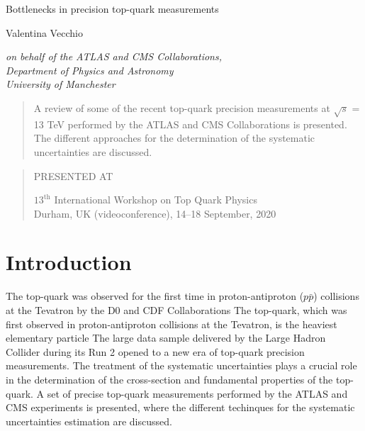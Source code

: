\documentclass[12pt]{article}
\newcommand\pubnumber{SNSN-323-63}
\newcommand\pubdate{\today}
\def\institute{on behalf of the ATLAS and CMS Collaborations,\\Department of Physics and Astronomy\\ University of Manchester}
\def\Title#1{\begin{center} {\Large #1 } \end{center}}
\def\Author#1{\begin{center}{ \sc #1} \end{center}}
\def\Address#1{\begin{center}{ \it #1} \end{center}}
\newcommand\pubblock{\rightline{\begin{tabular}{l} \pubnumber\\
         \pubdate  \end{tabular}}}
\newenvironment{Abstract}{\begin{quotation}  }{\end{quotation}}
\newenvironment{Presented}{\begin{quotation} \begin{center} 
             PRESENTED AT\end{center}\bigskip 
      \begin{center}\begin{large}}{\end{large}\end{center} \end{quotation}}
\begin{document}
\begin{titlepage}
\pubblock

\vfill
\Title{Bottlenecks in precision top-quark measurements}
\vfill
\Author{ Valentina Vecchio}
\Address{\institute}
\vfill
\begin{Abstract}


A review of some of the recent top-quark precision measurements at $\sqrt{s}$ = 13 TeV performed by the ATLAS and CMS Collaborations is presented. The different approaches for the determination of the systematic uncertainties are discussed. 


\end{Abstract}
\vfill
\begin{Presented}
$13^\mathrm{th}$ International Workshop on Top Quark Physics\\
Durham, UK (videoconference), 14--18 September, 2020
\end{Presented}
\vfill
\end{titlepage}
\def\thefootnote{\fnsymbol{footnote}}
\setcounter{footnote}{0}
%

\section{Introduction}
The top-quark was observed for the first time in proton-antiproton ($p\bar{p}$) collisions at the Tevatron by the D0 and CDF Collaborations %
\cite{Aaltonen_2009}
The top-quark, which was first observed in proton-antiproton collisions at the Tevatron, is the heaviest elementary particle 
The large data sample delivered by the Large Hadron Collider during its Run 2 opened to a new era of top-quark precision measurements. The treatment of the systematic uncertainties plays a crucial role in the determination of the cross-section and fundamental properties of the top-quark. A set of precise top-quark measurements performed by the ATLAS and CMS experiments is presented, where the different techinques for the systematic uncertainties estimation are discussed.
\end{document}

